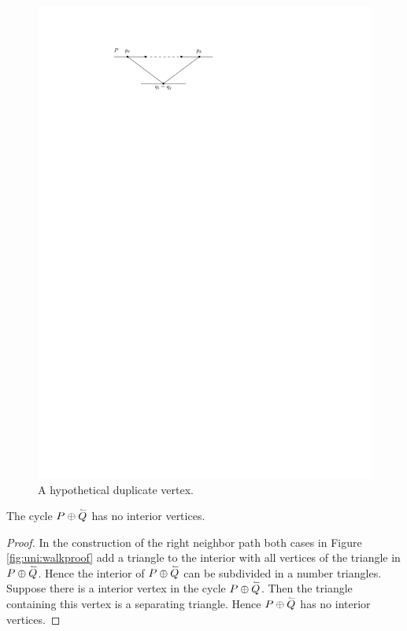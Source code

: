     \begin{figure}[h]
      \centering
      \includegraphics[scale=1]{unifiedAlgo/img/rightNeighbourwalk/neighborPathisPath.pdf}
      \caption{A hypothetical duplicate vertex.}
      \label{fig:right:path}
    \end{figure}

    \begin{lemma}
      \label{lm:right:neighbourwalkNoInteriorVertex}
      The cycle $P \oplus \accentset{\leftharpoonup}{Q}$ has no interior vertices.
    \end{lemma}
    \begin{proof}
      In the construction of the right neighbor path both cases in Figure \ref{fig:uni:walkproof} add a triangle to the interior with all vertices of the triangle in $P \oplus \accentset{\leftharpoonup}{Q}$. Hence the interior of $P \oplus \accentset{\leftharpoonup}{Q}$ can be subdivided in a number triangles.
      Suppose there is a interior vertex in the cycle $P \oplus \accentset{\leftharpoonup}{Q}$. Then the triangle containing this vertex is a separating triangle. Hence $P \oplus \accentset{\leftharpoonup}{Q}$ has no interior vertices.
    \end{proof}

